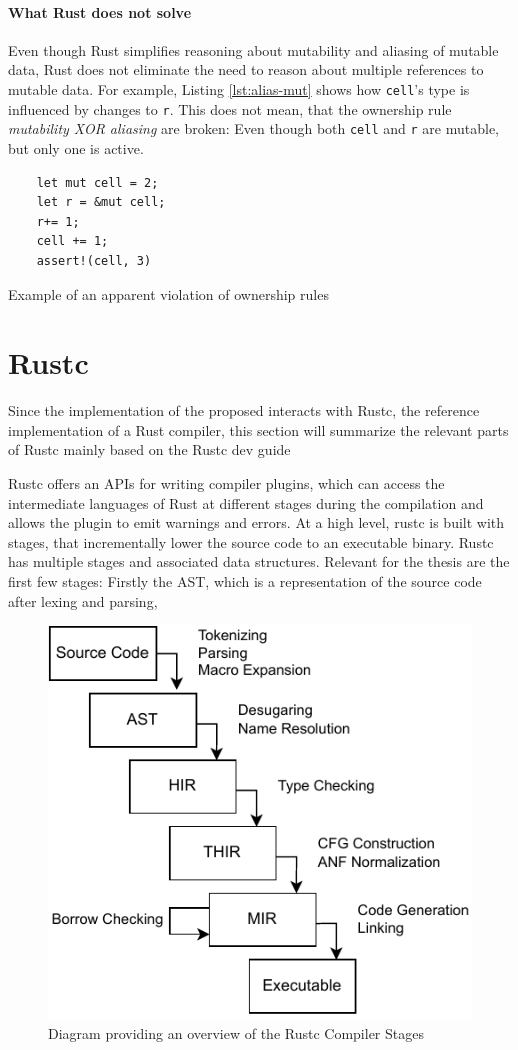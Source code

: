 \documentclass{book}
\newcommand{\code}[1]{\texttt{#1}}
\theoremstyle{definition}
\begin{document}
\paragraph*{What Rust does not solve} Even though Rust simplifies reasoning about mutability and aliasing of mutable data, Rust does not eliminate the need to reason about multiple references to mutable data. For example, Listing \ref{lst:alias-mut} shows how \code{cell}'s type is influenced by changes to \code{r}. This does not mean, that the ownership rule  \textit{mutability XOR aliasing} are broken: Even though both \code{cell} and \code{r} are mutable, but only one is active.

\begin{listing}[ht]
  \begin{verbatim}
    let mut cell = 2;
    let r = &mut cell;
    r+= 1;
    cell += 1;
    assert!(cell, 3)
  \end{verbatim}
  \caption{Example of an apparent violation of ownership rules}
  \label{lst:alias-mut}
\end{listing}

\section{Rustc}

Since the implementation of the proposed interacts with Rustc, the reference implementation of a Rust compiler, this section will summarize the relevant parts of Rustc mainly based on the Rustc dev guide \cite{noauthor_overview_nodate}

Rustc offers an APIs for writing compiler plugins, which can access the intermediate languages of Rust at different stages during the compilation and allows the plugin to emit warnings and errors. 
At a high level, rustc is built with stages, that incrementally lower the source code to an executable binary. Rustc has multiple stages and associated data structures. 
Relevant for the thesis are the first few stages: Firstly the AST, which is a representation of the source code after lexing and parsing, 

\begin{figure}[h]
	\centering
	\includegraphics[width=0.7\linewidth]{./rustc-stages.pdf}
	\caption{Diagram providing an overview of the Rustc Compiler Stages}
	\label{fig:rust-stages}
\end{figure}
\end{document}
